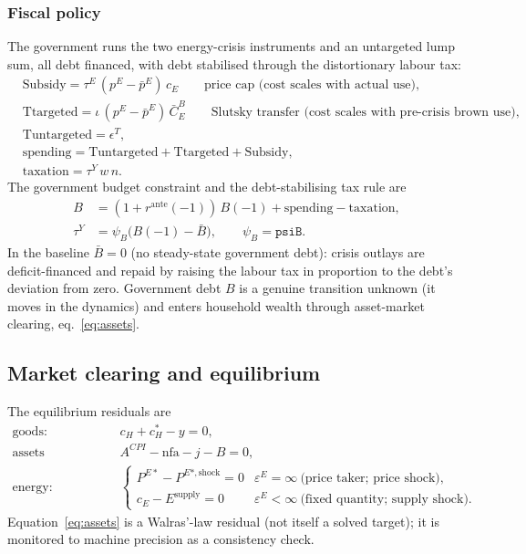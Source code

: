 \documentclass[11pt,a4paper]{article}
\newcommand{\pE}{p^{E}}
\begin{document}
\subsubsection{Fiscal policy}\label{sec:fiscal}

The government runs the two energy-crisis instruments and an untargeted lump sum,
all debt financed, with debt stabilised through the distortionary labour tax:
\begin{align}
&\text{Subsidy} = \tau^{E}\,(\pE-\bar\pE)\,c_E \qquad\text{price cap (cost scales with actual use),}\\
&\text{Ttargeted} = \iota\,(\pE-\bar\pE)\,\bar C^{B}_{E} \qquad\text{Slutsky transfer (cost scales with pre-crisis brown use),}\\
&\text{Tuntargeted} = \epsilon^{T}, \\[2pt]
&\text{spending} = \text{Tuntargeted}+\text{Ttargeted}+\text{Subsidy},\\
&\text{taxation}=\tau^{Y}\,w\,n. 
\end{align}
The government budget constraint and the debt-stabilising tax rule are
\begin{align}
B &= (1+r^{\text{ante}}(-1))\,B(-1)+\text{spending}-\text{taxation},
\label{eq:gbc}\\
\tau^{Y} &= \psi_B\bigl(B(-1)-\bar B\bigr),\qquad \psi_B=\texttt{psiB}.
\label{eq:taurule}
\end{align}
In the baseline $\bar B=0$ (no steady-state government debt): crisis outlays are
deficit-financed and repaid by raising the labour tax in proportion to the debt's
deviation from zero. Government debt $B$ is a genuine transition unknown (it moves
in the dynamics) and enters household wealth through asset-market clearing,
eq.~\eqref{eq:assets}.

\subsection{Market clearing and equilibrium}\label{sec:clearing}

The equilibrium residuals are
\begin{align}
\text{goods:}&\quad c_H+c_H^{*}-y=0, \label{eq:goods}\\
\text{assets (Walras):}&\quad A^{CPI}-\mathrm{nfa}-j-B=0, \label{eq:assets}\\
\text{energy:}&\quad
\begin{cases}
P^{E*}-P^{E*,\text{shock}}=0 & \varepsilon^{E}=\infty\ \text{(price taker; price shock)},\\
c_E-E^{\text{supply}}=0 & \varepsilon^{E}<\infty\ \text{(fixed quantity; supply shock).}
\end{cases}\label{eq:energy}
\end{align}
Equation~\eqref{eq:assets} is a Walras'-law residual (not itself a solved
target); it is monitored to machine precision as a consistency check.
\end{document}
